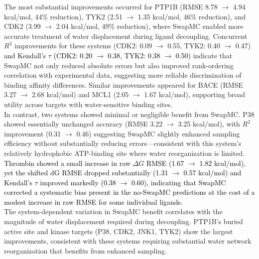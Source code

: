 \documentclass[journal=jacsat,manuscript=article]{achemso}
\newcommand*{\textblue}[1]{\textcolor{black}{#1}}
\begin{document}
\newline
The most substantial improvements occurred for PTP1B (RMSE 8.78 $\to$ 4.94 kcal/mol, 44\% reduction), TYK2 (2.51 $\to$ 1.35 kcal/mol, 46\% reduction), and CDK2 (3.99 $\to$ 2.04 kcal/mol, 49\% reduction), 
where SwapMC enabled more accurate treatment of water displacement during ligand decoupling. 
Concurrent $R^2$ improvements for these systems (CDK2: 0.09 $\to$ 0.55, TYK2: 0.40 $\to$ 0.47) 
\textblue{and Kendall's $\tau$ (CDK2: 0.20 $\to$ 0.38, TYK2: 0.38 $\to$ 0.50)} 
indicate that SwapMC not only reduced absolute errors but also improved rank-ordering correlation with experimental data, suggesting more reliable discrimination of binding affinity differences. 
Similar improvements appeared for BACE (RMSE 3.27 $\to$ 2.68 kcal/mol) and MCL1 (2.05 $\to$ 1.67 kcal/mol), supporting broad utility across targets with water-sensitive binding sites.\\
\newline
In contrast, two systems showed minimal or negligible benefit from SwapMC. P38 showed essentially unchanged accuracy (RMSE 3.22 $\to$ 3.25 kcal/mol), 
with $R^2$ improvement (0.31 $\to$ 0.46) suggesting SwapMC slightly enhanced sampling efficiency without substantially reducing errors—consistent with this system's relatively hydrophobic ATP-binding site where water reorganization is limited. %
\textblue{
Thrombin showed a small increase in raw $\Delta G$ RMSE (1.67 $\to$ 1.82 kcal/mol), 
yet the shifted dG RMSE dropped substantially (1.31 $\to$ 0.57 kcal/mol) 
and Kendall's $\tau$ improved markedly (0.38 $\to$ 0.60), 
indicating that SwapMC corrected a systematic bias present in the no-SwapMC predictions 
at the cost of a modest increase in raw RMSE for some individual ligands.
} \\
\newline
The system-dependent variation in SwapMC benefit correlates with the magnitude of water displacement required during decoupling. 
PTP1B's buried active site and kinase targets (P38, CDK2, JNK1, TYK2) show the largest improvements, consistent with these systems requiring substantial water network reorganization that benefits from enhanced sampling.
\end{document}
